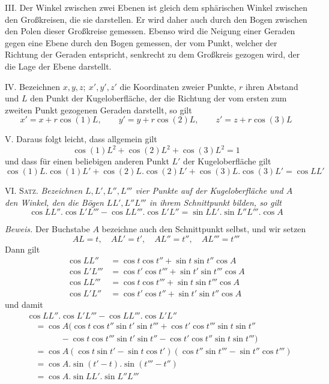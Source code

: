 \par\indent{}%
III. Der Winkel zwischen zwei Ebenen ist gleich dem sphärischen Winkel zwischen den Großkreisen, die sie darstellen. Er wird daher auch durch den Bogen zwischen den Polen dieser Großkreise gemessen. Ebenso wird die Neigung einer Geraden gegen eine Ebene durch den Bogen gemessen, der vom Punkt, welcher der Richtung der Geraden entspricht, senkrecht zu dem Großkreis gezogen wird, der die Lage der Ebene darstellt.

IV. Bezeichnen \(x,y,z;\ x',y',z'\) die Koordinaten zweier Punkte, \(r\) ihren Abstand und \(L\) den Punkt der Kugeloberfläche, der die Richtung der vom ersten zum zweiten Punkt gezogenen Geraden darstellt, so gilt
\[
x'=x+r\cos(1)L,\qquad y'=y+r\cos(2)L,\qquad z'=z+r\cos(3)L
\]
\par\indent V. Daraus folgt leicht, dass allgemein gilt
\[
\cos(1)L^2+\cos(2)L^2+\cos(3)L^2=1
\]
\noindent und dass für einen beliebigen anderen Punkt \(L'\) der Kugeloberfläche gilt
\[
\cos(1)L\mathord{.}\cos(1)L'+\cos(2)L\mathord{.}\cos(2)L'+\cos(3)L\mathord{.}\cos(3)L'=\cos LL'
\]
\par\indent VI. \textsc{Satz.} \textit{Bezeichnen \(L,L',L'',L'''\) vier Punkte auf der Kugeloberfläche und \(A\) den Winkel, den die Bögen \(LL',L''L'''\) in ihrem Schnittpunkt bilden, so gilt}
\[
\cos LL''\mathord{.}\cos L'L'''-\cos LL'''\mathord{.}\cos L'L''=\sin LL'\mathord{.}\sin L''L'''\mathord{.}\cos A
\]
\par\indent\textit{Beweis.} Der Buchstabe \(A\) bezeichne auch den Schnittpunkt selbst, und wir setzen
\[
AL=t,\quad AL'=t',\quad AL''=t'',\quad AL'''=t'''
\]
\noindent Dann gilt
\[
\begin{aligned}
\cos LL''&=\cos t\cos t''+\sin t\sin t''\cos A\\
\cos L'L'''&=\cos t'\cos t'''+\sin t'\sin t'''\cos A\\
\cos LL'''&=\cos t\cos t'''+\sin t\sin t'''\cos A\\
\cos L'L''&=\cos t'\cos t''+\sin t'\sin t''\cos A
\end{aligned}
\]
\noindent und damit
\[
\begin{aligned}
&\cos LL''\mathord{.}\cos L'L'''-\cos LL'''\mathord{.}\cos L'L''\\
&\quad=\cos A(\cos t\cos t''\sin t'\sin t'''+\cos t'\cos t'''\sin t\sin t''\\
&\qquad\qquad-\cos t\cos t'''\sin t'\sin t''-\cos t'\cos t''\sin t\sin t''')\\
&\quad=\cos A(\cos t\sin t'-\sin t\cos t')(\cos t''\sin t'''-\sin t''\cos t''')\\
&\quad=\cos A\mathord{.}\sin(t'-t)\mathord{.}\sin(t'''-t'')\\
&\quad=\cos A\mathord{.}\sin LL'\mathord{.}\sin L''L'''
\end{aligned}
\]
